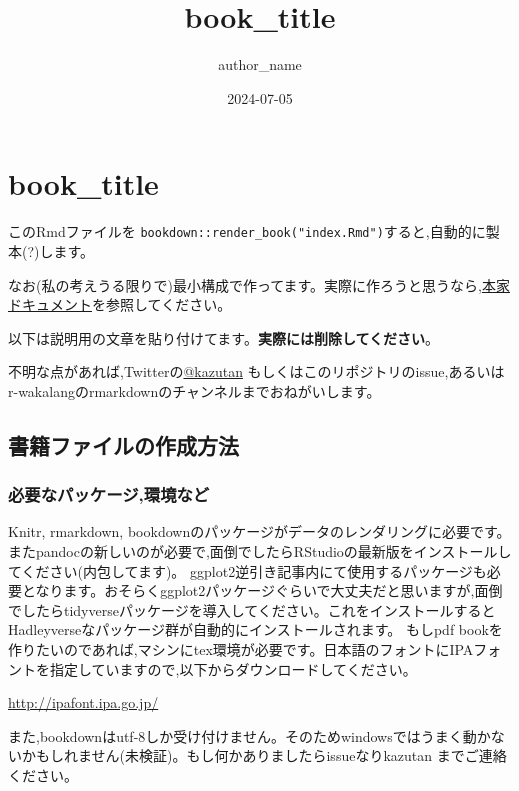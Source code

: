 \documentclass[
]{book}
\title{book\_title}
\author{author\_name}
\date{2024-07-05}
\begin{document}
\maketitle

{
\setcounter{tocdepth}{1}
\tableofcontents
}
\chapter{book\_title}\label{book_title}

このRmdファイルを \texttt{bookdown::render\_book("index.Rmd")}すると,自動的に製本(?)します。

なお(私の考えうる限りで)最小構成で作ってます。実際に作ろうと思うなら,\href{https://bookdown.org/yihui/bookdown/}{本家ドキュメント}を参照してください。

以下は説明用の文章を貼り付けてます。\textbf{実際には削除してください}。

不明な点があれば,Twitterの\href{https://twitter.com/kazutan}{@kazutan} もしくはこのリポジトリのissue,あるいはr-wakalangのrmarkdownのチャンネルまでおねがいします。

\section{書籍ファイルの作成方法}\label{ux66f8ux7c4dux30d5ux30a1ux30a4ux30ebux306eux4f5cux6210ux65b9ux6cd5}

\subsection{必要なパッケージ,環境など}\label{ux5fc5ux8981ux306aux30d1ux30c3ux30b1ux30fcux30b8ux74b0ux5883ux306aux3069}

Knitr, rmarkdown, bookdownのパッケージがデータのレンダリングに必要です。またpandocの新しいのが必要で,面倒でしたらRStudioの最新版をインストールしてください(内包してます)。
ggplot2逆引き記事内にて使用するパッケージも必要となります。おそらくggplot2パッケージぐらいで大丈夫だと思いますが,面倒でしたらtidyverseパッケージを導入してください。これをインストールするとHadleyverseなパッケージ群が自動的にインストールされます。
もしpdf bookを作りたいのであれば,マシンにtex環境が必要です。日本語のフォントにIPAフォントを指定していますので,以下からダウンロードしてください。

\url{http://ipafont.ipa.go.jp/}

また,bookdownはutf-8しか受け付けません。そのためwindowsではうまく動かないかもしれません(未検証)。もし何かありましたらissueなりkazutan までご連絡ください。
\end{document}
